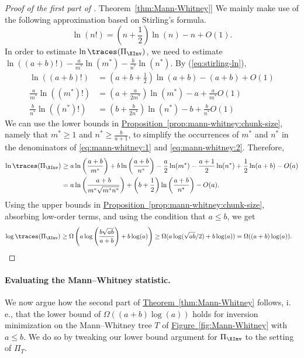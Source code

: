 \documentclass[11pt]{article}
\numberwithin{equation}{section}
\theoremstyle{definition}
\theoremstyle{plain}
\newcommand{\ie}{i.\,e.}
\newcommand{\expref}[2]{\hyperref[#2]{#1~\ref{#2}}}
\begin{document}
\begin{proof}[Proof of the first part of \expref{Theorem}{thm:Mann-Whitney}]
We mainly make use of the following approximation based on Stirling's formula.
    \begin{equation}
        \label{eq:stirling-ln}
        \ln(n!) = \left(n+\frac{1}{2}\right)\ln(n)-n+O(1).
    \end{equation}
    In order to estimate $\ln \traces(\Pi_{\XInv})$, we need to estimate $\ln((a+b)!)-\frac{a}{m^*}\ln(m^*)-\frac{b}{n^*}\ln(n^*)$. By (\ref{eq:stirling-ln}),
    \begin{align}
        \ln((a+b)!) &= \left(a+b+\frac{1}{2}\right)\ln(a+b) - (a+b) + O(1)\\
        \frac{a}{m^*}\ln((m^*)!) &= \left(a+\frac{a}{2m^*}\right)\ln(m^*) - a + \frac{a}{m^*}O(1) \label{eq:mann-whitney:1}\\
        \frac{b}{n^*}\ln((n^*)!) &= \left(b+\frac{b}{2n^*}\right)\ln(n^*) - b + \frac{b}{n^*}O(1) \label{eq:mann-whitney:2}
    \end{align}
    We can use the lower bounds in \expref{Proposition}{prop:mann-whitney:chunk-size}, namely that $m^*\ge 1$ and $n^*\ge \frac{b}{a+1}$, to simplify the occurrences of $m^*$ and $n^*$ in the denominators of \eqref{eq:mann-whitney:1} and \eqref{eq:mann-whitney:2}. Therefore,
    \begin{align*}
        \ln \traces(\Pi_{\XInv}) &\ge a\ln\left(\frac{a+b}{m^*}\right)+b\ln\left(\frac{a+b}{n^*}\right) - \frac{a}{2}\ln(m^*) - \frac{a+1}{2}\ln(n^*) + \frac{1}{2}\ln(a+b) - O(a)\\
        &= a\ln\left(\frac{a+b}{m^*\sqrt{m^*n^*}}\right)+\left(b+\frac{1}{2}\right)\ln\left(\frac{a+b}{n^*}\right)- O(a).
    \end{align*}
    Using the upper bounds in \expref{Proposition}{prop:mann-whitney:chunk-size}, absorbing low-order terms, and using the condition that $a \le b$, we get
    \begin{align*}
        \log \traces(\Pi_{\XInv}) &\ge \Omega\left(a \log\left(\frac{b\sqrt{ab}}{a+b}\right) + b \log(a)\right) \ge \Omega(a \log(\sqrt{ab}/2) + b \log(a)) = 
        \Omega((a+b)\log(a)).
    \end{align*}
\end{proof}

\paragraph{Evaluating the Mann--Whitney statistic.} 
We now argue how the second part of \expref{Theorem}{thm:Mann-Whitney} follows, \ie, that the lower bound of $\Omega((a+b)\log(a))$ holds for inversion minimization on the Mann--Whitney tree $T$ of \expref{Figure}{fig:Mann-Whitney} with $a \le b$. We do so by tweaking our lower bound argument for $\Pi_{\XInv}$ to the setting of $\Pi_T$.
\end{document}
